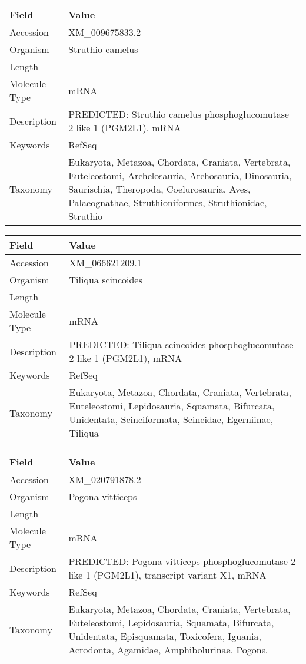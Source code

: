 \documentclass[10pt]{article}
\begin{document}
\vspace{1em}
{\footnotesize
\begin{longtable}{>{\raggedright\arraybackslash}p{4.5cm} >{\raggedright\arraybackslash}p{11.5cm}}
\textbf{Field} & \textbf{Value} \\
\hline
Accession & XM\_009675833.2 \\
Organism & Struthio camelus \\
Length & 5760 \\
Molecule Type & mRNA \\
Description & PREDICTED: Struthio camelus phosphoglucomutase 2 like 1 (PGM2L1), mRNA \\
Keywords & RefSeq \\
Taxonomy & Eukaryota, Metazoa, Chordata, Craniata, Vertebrata, Euteleostomi, Archelosauria, Archosauria, Dinosauria, Saurischia, Theropoda, Coelurosauria, Aves, Palaeognathae, Struthioniformes, Struthionidae, Struthio \\
\end{longtable}
}

\vspace{1em}
{\footnotesize
\begin{longtable}{>{\raggedright\arraybackslash}p{4.5cm} >{\raggedright\arraybackslash}p{11.5cm}}
\textbf{Field} & \textbf{Value} \\
\hline
Accession & XM\_066621209.1 \\
Organism & Tiliqua scincoides \\
Length & 4164 \\
Molecule Type & mRNA \\
Description & PREDICTED: Tiliqua scincoides phosphoglucomutase 2 like 1 (PGM2L1), mRNA \\
Keywords & RefSeq \\
Taxonomy & Eukaryota, Metazoa, Chordata, Craniata, Vertebrata, Euteleostomi, Lepidosauria, Squamata, Bifurcata, Unidentata, Scinciformata, Scincidae, Egerniinae, Tiliqua \\
\end{longtable}
}

\vspace{1em}
{\footnotesize
\begin{longtable}{>{\raggedright\arraybackslash}p{4.5cm} >{\raggedright\arraybackslash}p{11.5cm}}
\textbf{Field} & \textbf{Value} \\
\hline
Accession & XM\_020791878.2 \\
Organism & Pogona vitticeps \\
Length & 4291 \\
Molecule Type & mRNA \\
Description & PREDICTED: Pogona vitticeps phosphoglucomutase 2 like 1 (PGM2L1), transcript variant X1, mRNA \\
Keywords & RefSeq \\
Taxonomy & Eukaryota, Metazoa, Chordata, Craniata, Vertebrata, Euteleostomi, Lepidosauria, Squamata, Bifurcata, Unidentata, Episquamata, Toxicofera, Iguania, Acrodonta, Agamidae, Amphibolurinae, Pogona \\
\end{longtable}
}
\end{document}
